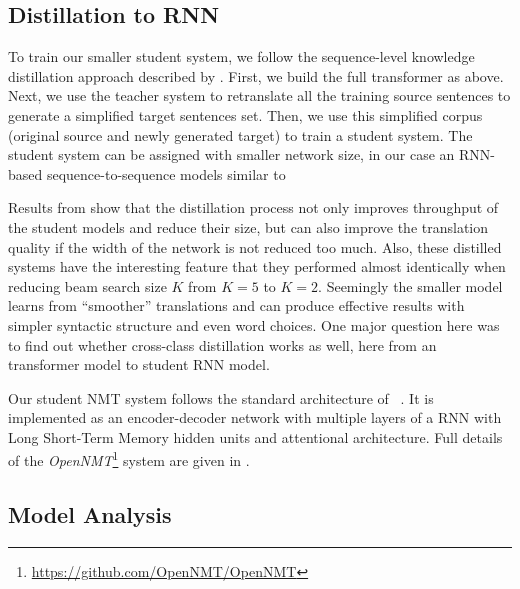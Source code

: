 \documentclass[11pt,a4paper]{article}
\begin{document}
\subsection{Distillation to RNN}
\label{distill}

To train our smaller student system, we follow the sequence-level
knowledge distillation approach described by
. First, we build the full transformer as
above. Next, we use the teacher system to retranslate all the training
source sentences to generate a simplified target sentences set.  Then,
we use this simplified corpus (original source and newly generated
target) to train a student system.  The student system can be assigned
with smaller network size, in our case an RNN-based
sequence-to-sequence models similar to 

Results from  show that the
distillation process not only improves throughput of the student
models and reduce their size, but can also improve the translation
quality if the width of the network is not reduced too much. Also,
these distilled systems have the interesting feature that they
performed almost identically when reducing beam search size $K$ from
$K=5$ to $K=2$. Seemingly the smaller model learns from ``smoother''
translations and can produce effective results with simpler syntactic
structure and even word choices. One major question here was to find
out whether cross-class distillation works as well, here from an
transformer model to student RNN model.

Our student NMT system follows the standard architecture of
~. It is implemented as an
encoder-decoder network with multiple layers of a RNN with Long
Short-Term Memory hidden \cite{Hochreiter:1997:LSM:1246443.1246450} units and attentional architecture. Full
details of the
\textit{OpenNMT}\footnote{\url{https://github.com/OpenNMT/OpenNMT}}
system are given in .


\subsection{Model Analysis}
\label{seq2seq}
\end{document}
